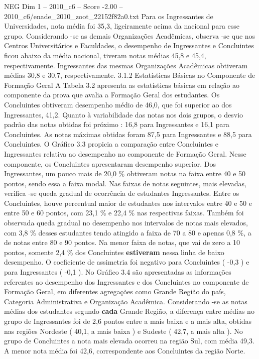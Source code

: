 \begin{textsample}{NEG Dim 1 – 2010\_c6 – Score -2.00 – 2010\_c6/enade\_2010\_zoot\_22152f82a0.txt}
Para os Ingressantes de Universidades, nota média foi 35,3, ligeiramente acima da nacional para esse grupo.
Considerando -se as demais Organizações Acadêmicas, observa -se que nos Centros Universitários e Faculdades, o desempenho de Ingressantes e Concluintes ficou abaixo da média nacional, tiveram notas médias 45,8 e 45,4, respectivamente.
Ingressantes das mesmas Organizações Acadêmicas obtiveram médias 30,8 e 30,7, respectivamente. 3.1.2 Estatísticas Básicas no Componente de Formação Geral A Tabela 3.2 apresenta as estatísticas básicas em relação ao componente da prova que avalia a Formação Geral dos estudantes.
Os Concluintes obtiveram desempenho médio de 46,0, que foi superior ao dos Ingressantes, 41,2.
Quanto à variabilidade das notas nos dois grupos, o desvio padrão das notas obtidas foi próximo : 16,8 para Ingressantes e 16,1 para Concluintes.
As notas máximas obtidas foram 87,5 para Ingressantes e 88,5 para Concluintes.
O Gráfico 3.3 propicia a comparação entre Concluintes e Ingressantes relativa ao desempenho no componente de Formação Geral.
Nesse componente, os Concluintes apresentaram desempenho superior.
Dos Ingressantes, um pouco mais de 20,0 \% obtiveram notas na faixa entre 40 e 50 pontos, sendo essa a faixa modal.
Nas faixas de notas seguintes, mais elevadas, verifica -se queda gradual de ocorrência de estudantes Ingressantes.
Entre os Concluintes, houve percentual maior de estudantes nos intervalos entre 40 e 50 e entre 50 e 60 pontos, com 23,1 \% e 22,4 \% nas respectivas faixas.
Também foi observada queda gradual no desempenho nos intervalos de notas mais elevados, com 3,8 \% desses estudantes tendo atingido a faixa de 70 a 80 e apenas 0,8 \%, a de notas entre 80 e 90 pontos.
Na menor faixa de notas, que vai de zero a 10 pontos, somente 2,4 \% dos Concluintes \textbf{estiveram} nessa linha de baixo desempenho.
O coeficiente de assimetria foi negativo para Concluintes ( -0,3 ) e para Ingressantes ( -0,1 ).
No Gráfico 3.4 são apresentadas as informações referentes ao desempenho dos Ingressantes e dos Concluintes no componente de Formação Geral, em diferentes agregações como Grande Região do país, Categoria Administrativa e Organização Acadêmica.
Considerando -se as notas médias dos estudantes segundo \textbf{cada} Grande Região, a diferença entre médias no grupo de Ingressantes foi de 2,6 pontos entre a mais baixa e a mais alta, obtidas nas regiões Nordeste ( 40,1, a mais baixa ) e Sudeste ( 42,7, a mais alta ).
No grupo de Concluintes a nota mais elevada ocorreu na região Sul, com média 49,3.
A menor nota média foi 42,6, correspondente aos Concluintes da região Norte.

\end{textsample}
